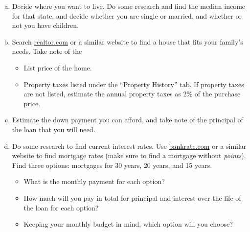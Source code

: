 \begin{exercises}
{\begin{enumerate}[(a)]
\item Decide where you want to live.  Do some research and find the median income for that state, and decide whether you are single or married, and whether or not you have children.
\item Search \href{http://www.realtor.com}{realtor.com} or a similar website to find a house that fits your family's needs.  Take note of the
\begin{itemize}
\item List price of the home.
\item Property taxes listed under the ``Property History'' tab.  If property taxes are not listed, estimate the annual property taxes as 2\% of the purchase price.
\end{itemize}
\item Estimate the down payment you can afford, and take note of the principal of the loan that you will need.
\item Do some research to find current interest rates.  Use \href{http://www.bankrate.com}{bankrate.com} or a similar website to find mortgage rates (make sure to find a mortgage without \emph{points}).  Find three options: mortgages for 30 years, 20 years, and 15 years.
\begin{itemize}
\item What is the monthly payment for each option?
\item How much will you pay in total for principal and interest over the life of the loan for each option?
\item Keeping your monthly budget in mind, which option will you choose?
\end{itemize}


\end{enumerate}}
\end{exercises}

